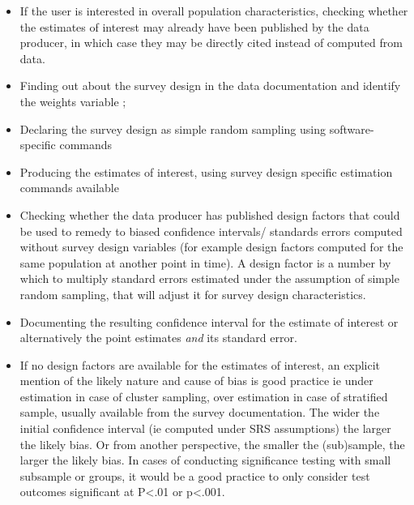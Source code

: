 \documentclass[
  14,
  a4paper,
  DIV=11,
  numbers=noendperiod]{scrartcl}
\begin{document}
\begin{itemize}
\item
  If the user is interested in overall population characteristics,
  checking whether the estimates of interest may already have been
  published by the data producer, in which case they may be directly
  cited instead of computed from data.
\item
  Finding out about the survey design in the data documentation and
  identify the weights variable ;
\item
  Declaring the survey design as simple random sampling using
  software-specific commands
\item
  Producing the estimates of interest, using survey design specific
  estimation commands available
\item
  Checking whether the data producer has published design factors that
  could be used to remedy to biased confidence intervals/ standards
  errors computed without survey design variables (for example design
  factors computed for the same population at another point in time). A
  design factor is a number by which to multiply standard errors
  estimated under the assumption of simple random sampling, that will
  adjust it for survey design characteristics.
\item
  Documenting the resulting confidence interval for the estimate of
  interest or alternatively the point estimates \emph{and} its standard
  error.
\item
  If no design factors are available for the estimates of interest, an
  explicit mention of the likely nature and cause of bias is good
  practice ie under estimation in case of cluster sampling, over
  estimation in case of stratified sample, usually available from the
  survey documentation. The wider the initial confidence interval (ie
  computed under SRS assumptions) the larger the likely bias. Or from
  another perspective, the smaller the (sub)sample, the larger the
  likely bias. In cases of conducting significance testing with small
  subsample or groups, it would be a good practice to only consider test
  outcomes significant at P\textless.01 or p\textless.001.
\end{itemize}
\end{document}
